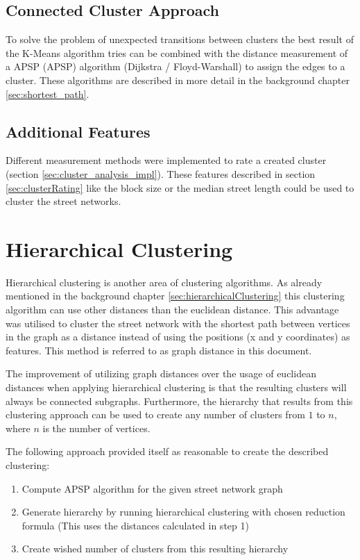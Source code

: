 \subsection{Connected Cluster Approach} \label{sec:connected_cluster_approach}
To solve the problem of unexpected transitions between clusters the best result of the K-Means algorithm tries can be combined with the distance measurement of a \acrlong{APSP} (\acrshort{APSP}) algorithm (Dijkstra / Floyd-Warshall) to assign the edges to a cluster. These algorithms are described in more detail in the background chapter \ref{sec:shortest_path}.

\subsection{Additional Features}
Different measurement methods were implemented to rate a created cluster (section \ref{sec:cluster_analysis_impl}). These features described in section \ref{sec:clusterRating} like the block size or the median street length could be used to cluster the street networks.

\pagebreak
\section{Hierarchical Clustering}
Hierarchical clustering is another area of clustering algorithms. As already mentioned in the background chapter \ref{sec:hierarchicalClustering} this clustering algorithm can use other distances than the euclidean distance. This advantage was utilised to cluster the street network with the shortest path between vertices in the graph as a distance instead of using the positions (x and y coordinates) as features. This method is referred to as graph distance in this document.

The improvement of utilizing graph distances over the usage of euclidean distances when applying hierarchical clustering is that the resulting clusters will always be connected subgraphs. Furthermore, the hierarchy that results from this clustering approach can be used to create any number of clusters from $1$ to $n$, where $n$ is the number of vertices.

The following approach provided itself as reasonable to create the described clustering:

\begin{enumerate}
    \item Compute \acrshort{APSP} algorithm for the given street network graph
    \item Generate hierarchy by running hierarchical clustering with chosen reduction formula (This uses the distances calculated in step 1)
    \item Create wished number of clusters from this resulting hierarchy
\end{enumerate}

